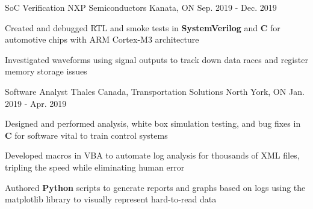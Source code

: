 \begin{cventries}
  \cventry
    {SoC Verification} %
    {NXP Semiconductors} %
    {Kanata, ON} %
    {Sep. 2019 - Dec. 2019} %
    {
      \begin{cvitems} %
        \item {Created and debugged RTL and smoke tests in \textbf{SystemVerilog} and \textbf{C} for automotive chips with ARM Cortex-M3 architecture}
        \item {Investigated waveforms using signal outputs to track down data races and register memory storage issues}
      \end{cvitems}
    }

  \cventry
    {Software Analyst} %
    {Thales Canada, Transportation Solutions} %
    {North York, ON} %
    {Jan. 2019 - Apr. 2019} %
    {
      \begin{cvitems} %
        \item {Designed and performed analysis, white box simulation testing, and bug fixes in \textbf{C} for software vital to train control systems}
        \item {Developed macros in VBA to automate log analysis for thousands of XML files, tripling the speed while eliminating human error}
        \item {Authored \textbf{Python} scripts to generate reports and graphs based on logs using the matplotlib library to visually represent hard-to-read data}
      \end{cvitems}
    }

\end{cventries}

